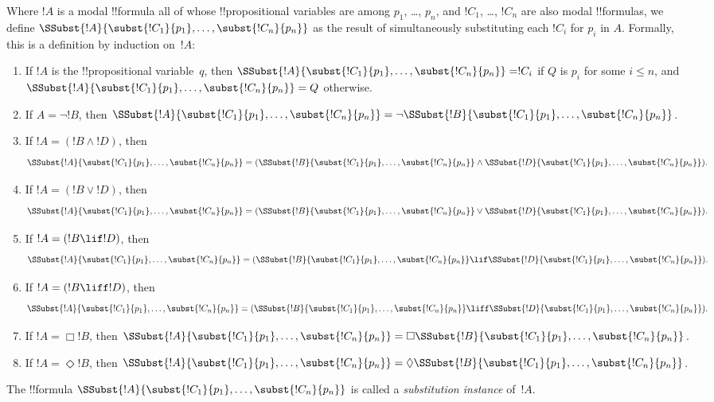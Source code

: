 \documentclass[../../../include/open-logic-section]{subfiles}
\begin{document}


\begin{defn}\label{def:subst-inst}
  Where $!A$ is a modal !!{formula} all of whose !!{propositional
    variable}s are among $p_1$, \dots, $p_n$, and $!C_1$, \dots,
  $!C_n$ are also modal !!{formula}s, we define
  $\SSubst{!A}{\subst{!C_1}{p_1}, \dots, \subst{!C_n}{p_n}}$ as the
    result of simultaneously substituting each $!C_i$ for $p_i$ in
    $\!A$. Formally, this is a definition by induction on~$!A$:
  \begin{enumerate}
  \item If $!A$ is the !!{propositional variable}~$q$, then
    $\SSubst{!A}{\subst{!C_1}{p_1}, \dots, \subst{!C_n}{p_n}} = !C_i$
    if $Q$ is $p_i$ for some $i \le n$, and
    $\SSubst{!A}{\subst{!C_1}{p_1}, \dots, \subst{!C_n}{p_n}} = Q$
    otherwise.
  \item If $\!A = \lnot!B$, then $\SSubst{!A}{\subst{!C_1}{p_1},
    \dots, \subst{!C_n}{p_n}} = \lnot \SSubst{!B}{\subst{!C_1}{p_1},
    \dots, \subst{!C_n}{p_n}}$.
  \item If $!A = (!B \land !D)$, then
    \[\SSubst{!A}{\subst{!C_1}{p_1}, \dots, \subst{!C_n}{p_n}} =
    (\SSubst{!B}{\subst{!C_1}{p_1}, \dots, \subst{!C_n}{p_n}} \land
    \SSubst{!D}{\subst{!C_1}{p_1}, \dots, \subst{!C_n}{p_n}}).\]
  \item If $!A = (!B \lor !D)$, then
    \[\SSubst{!A}{\subst{!C_1}{p_1}, \dots, \subst{!C_n}{p_n}} =
    (\SSubst{!B}{\subst{!C_1}{p_1}, \dots, \subst{!C_n}{p_n}} \lor
    \SSubst{!D}{\subst{!C_1}{p_1}, \dots, \subst{!C_n}{p_n}}).\]
  \item If $!A = (!B \lif !D)$, then
    \[\SSubst{!A}{\subst{!C_1}{p_1}, \dots, \subst{!C_n}{p_n}} =
    (\SSubst{!B}{\subst{!C_1}{p_1}, \dots, \subst{!C_n}{p_n}} \lif
    \SSubst{!D}{\subst{!C_1}{p_1}, \dots, \subst{!C_n}{p_n}}).\]
  \item If $!A = (!B \liff !D)$, then
    \[\SSubst{!A}{\subst{!C_1}{p_1}, \dots, \subst{!C_n}{p_n}} =
    (\SSubst{!B}{\subst{!C_1}{p_1}, \dots, \subst{!C_n}{p_n}} \liff
    \SSubst{!D}{\subst{!C_1}{p_1}, \dots, \subst{!C_n}{p_n}}).\]
  \item If $!A = \Box !B$, then $\SSubst{!A}{\subst{!C_1}{p_1}, \dots,
    \subst{!C_n}{p_n}} = \Box \SSubst{!B}{\subst{!C_1}{p_1}, \dots,
    \subst{!C_n}{p_n}}$.
  \item If $!A = \Diamond !B$, then $\SSubst{!A}{\subst{!C_1}{p_1}, \dots,
    \subst{!C_n}{p_n}} = \Diamond \SSubst{!B}{\subst{!C_1}{p_1}, \dots,
    \subst{!C_n}{p_n}}$.
  \end{enumerate}
  The !!{formula} $\SSubst{!A}{\subst{!C_1}{p_1}, \dots,
    \subst{!C_n}{p_n}}$ is called a \emph{substitution instance}
  of~$!A$.
\end{defn}
\end{document}
